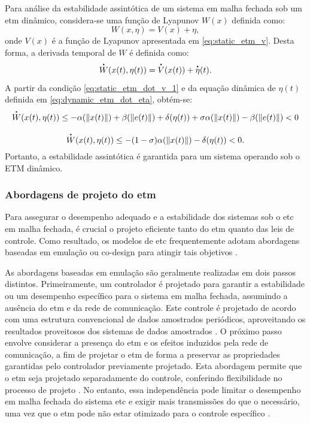 Para análise da estabilidade assintótica de um sistema em malha fechada sob um \acrshort{etm} dinâmico, considera-se uma função de Lyapunov $W(x)$ definida como: \begin{equation}
  W(x, \eta) = V(x) + \eta,
\end{equation} onde $V(x)$ é a função de Lyapunov apresentada em \eqref{eq:static_etm_v}. Desta forma, a derivada temporal de $W$ é definida como: \begin{equation}
  \dt{W}(x(t), \eta(t)) = \dt{V}(x(t)) + \dt{\eta}(t).
\end{equation} A partir da condição \eqref{eq:static_etm_dot_v_1} e da equação dinâmica de $\eta(t)$ definida em \eqref{eq:dynamic_etm_dot_eta}, obtém-se: \begin{gather}
  \dt{W}(x(t), \eta(t)) \leq - \alpha(\|x(t)\|) + \beta(\|e(t)\|) + \delta(\eta(t)) + \sigma \alpha(\|x(t)\|) - \beta(\|e(t)\|) < 0\\[8pt]
  \dt{W}(x(t), \eta(t)) \leq - (1 - \sigma)\alpha(\|x(t)\|) - \delta(\eta(t)) < 0.
\end{gather} Portanto, a estabilidade assintótica é garantida para um sistema operando sob o ETM dinâmico.

\subsubsection{Abordagens de projeto do \acrshort{etm}}

Para assegurar o desempenho adequado e a estabilidade dos sistemas sob o \acrshort{etc} em malha fechada, é crucial o projeto eficiente tanto do \acrshort{etm} quanto das leis de controle. Como resultado, os modelos de \acrshort{etc} frequentemente adotam abordagens baseadas em emulação ou co-design para atingir tais objetivos \citep{coutinho2021, peng2018}. 

As abordagens baseadas em emulação são geralmente realizadas em dois passos distintos. Primeiramente, um controlador é projetado para garantir a estabilidade ou um desempenho específico para o sistema em malha fechada, assumindo a ausência do \acrshort{etm} e da rede de comunicação. Este controle é projetado de acordo com uma estrutura convencional de dados amostrados periódicos, aproveitando os resultados proveitosos dos sistemas de dados amostrados \citep{coutinho2021,peng2018}. O próximo passo envolve considerar a presença do \acrshort{etm} e os efeitos induzidos pela rede de comunicação, a fim de projetar o \acrshort{etm} de forma a preservar as propriedades garantidas pelo controlador previamente projetado. Esta abordagem permite que o \acrshort{etm} seja projetado separadamente do controle, conferindo flexibilidade no processo de projeto \citep{coutinho2021,peng2018}. No entanto, essa independência pode limitar o desempenho em malha fechada do sistema \acrshort{etc} e exigir mais transmissões do que o necessário, uma vez que o \acrshort{etm} pode não estar otimizado para o controle específico \citep{coutinho2021}.

